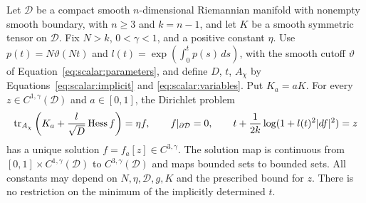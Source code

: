 \begin{lemma}\label{lem:elliptic:trial-trace}
Let $\mathcal D$ be a compact smooth $n$-dimensional Riemannian
manifold with nonempty smooth boundary, with $n\ge3$ and $k=n-1$,
and let $K$ be a smooth symmetric tensor on $\mathcal D$.
Fix $N>k$, $0<\gamma<1$, and a positive constant $\eta$.
Use $p(t)=N\vartheta(Nt)$ and
$l(t)=\exp(\int_0^t p(s)\,ds)$, with the smooth cutoff
$\vartheta$ of Equation~\eqref{eq:scalar:parameters}, and define
$D$, $t$, $A_\chi$ by Equations~\eqref{eq:scalar:implicit} and
\eqref{eq:scalar:variables}.  Put $K_a=aK$.
For every $z\in C^{1,\gamma}(\mathcal D)$ and $a\in[0,1]$,
the Dirichlet problem
\[
 \operatorname{tr}_{A_\chi}\left(K_a+\frac l{\sqrt D}\operatorname{Hess} f\right)=\eta f,
 \qquad f|_{\partial\mathcal D}=0,
 \qquad t+\frac1{2k}\log(1+l(t)^2|df|^2)=z
\]
has a unique solution $f=f_a[z]\in C^{3,\gamma}$.
The solution map is continuous from
$[0,1]\times C^{1,\gamma}(\mathcal D)$ to
$C^{3,\gamma}(\mathcal D)$ and maps bounded sets to bounded sets.
All constants may depend on $N,\eta,\mathcal D,g,K$ and the
prescribed bound for $z$.  There is no restriction on the minimum
of the implicitly determined $t$.
\end{lemma}


